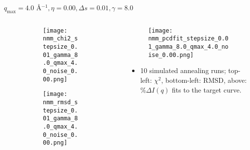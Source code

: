 \documentclass{beamer}
\begin{document}
\begin{frame}{$ q_{\textrm{max}}=4.0 $ \AA $^{-1}, \eta=0.00, \Delta s=0.01, \gamma=8.0$}
	\begin{columns}
		\begin{column}{.5\textwidth}
			\begin{figure}[H]
			\centering
			\begin{subfigure}[b]{\textwidth}
				\centering
				\texttt{[image: nmm\_chi2\_stepsize\_0.01\_gamma\_8.0\_qmax\_4.0\_noise\_0.00.png]}
				\label{fig:}
			\end{subfigure}
			\begin{subfigure}[b]{\textwidth}
				\centering
				\texttt{[image: nmm\_rmsd\_stepsize\_0.01\_gamma\_8.0\_qmax\_4.0\_noise\_0.00.png]}
				\label{fig:}
			\end{subfigure}
			\end{figure}
		\end{column}
		\begin{column}{.5\textwidth}
			\begin{figure}[H]
				\centering
				\texttt{[image: nmm\_pcdfit\_stepsize\_0.01\_gamma\_8.0\_qmax\_4.0\_noise\_0.00.png]}
				\label{fig:}
			\end{figure}
			\begin{itemize}
				\item 10 simulated annealing runs; top-left: $\chi^2$, bottom-left: RMSD, above: $\%\Delta I(q)$ fits to the target curve.
			\end{itemize}
		\end{column}
	\end{columns}
\end{frame}
 
\end{document}
